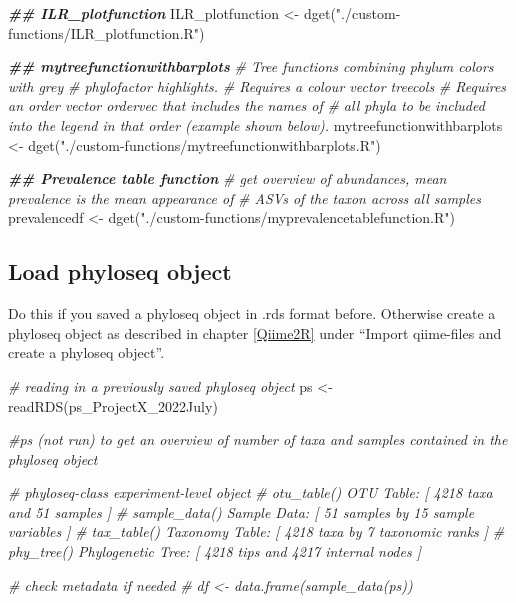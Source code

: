 \documentclass[
]{book}
\newenvironment{Shaded}{\begin{snugshade}}{\end{snugshade}}
\newcommand{\CommentTok}[1]{\textcolor[rgb]{0.56,0.35,0.01}{\textit{#1}}}
\newcommand{\DocumentationTok}[1]{\textcolor[rgb]{0.56,0.35,0.01}{\textbf{\textit{#1}}}}
\newcommand{\FunctionTok}[1]{\textcolor[rgb]{0.00,0.00,0.00}{#1}}
\newcommand{\NormalTok}[1]{#1}
\newcommand{\OtherTok}[1]{\textcolor[rgb]{0.56,0.35,0.01}{#1}}
\newcommand{\StringTok}[1]{\textcolor[rgb]{0.31,0.60,0.02}{#1}}
\begin{document}
\begin{Shaded}
\begin{Highlighting}[]
\DocumentationTok{\#\# ILR\_plotfunction}
\NormalTok{ILR\_plotfunction }\OtherTok{\textless{}{-}} \FunctionTok{dget}\NormalTok{(}\StringTok{"./custom{-}functions/ILR\_plotfunction.R"}\NormalTok{)}

\DocumentationTok{\#\# mytreefunctionwithbarplots}
\CommentTok{\# Tree functions combining phylum colors with grey }
\CommentTok{\# phylofactor highlights. }
\CommentTok{\# Requires a colour vector \textquotesingle{}treecols\textquotesingle{}}
\CommentTok{\# Requires an order vector \textquotesingle{}ordervec\textquotesingle{} that includes the names of }
\CommentTok{\# all phyla to be included into the legend in that order (example shown below). }
\NormalTok{mytreefunctionwithbarplots }\OtherTok{\textless{}{-}} \FunctionTok{dget}\NormalTok{(}\StringTok{"./custom{-}functions/mytreefunctionwithbarplots.R"}\NormalTok{)}

\DocumentationTok{\#\# Prevalence table function}
\CommentTok{\# get overview of abundances, mean prevalence is the mean \textquotesingle{}appearance\textquotesingle{} of }
\CommentTok{\# ASVs of the taxon across all samples}
\NormalTok{prevalencedf }\OtherTok{\textless{}{-}} \FunctionTok{dget}\NormalTok{(}\StringTok{"./custom{-}functions/myprevalencetablefunction.R"}\NormalTok{)}
\end{Highlighting}
\end{Shaded}

\hypertarget{load-phyloseq-object-2}{%
\subsection{Load phyloseq object}\label{load-phyloseq-object-2}}

Do this if you saved a phyloseq object in .rds format before. Otherwise create a phyloseq object as described in chapter \ref{Qiime2R} under ``Import qiime-files and create a phyloseq object''.

\begin{Shaded}
\begin{Highlighting}[]
\CommentTok{\# reading in a previously saved phyloseq object}
\NormalTok{ps }\OtherTok{\textless{}{-}} \FunctionTok{readRDS}\NormalTok{(}\StringTok{\textquotesingle{}ps\_ProjectX\_2022July\textquotesingle{}}\NormalTok{)}

\CommentTok{\#ps (not run) to get an overview of number of taxa and samples contained in the phyloseq object}

\CommentTok{\# phyloseq{-}class experiment{-}level object}
\CommentTok{\# otu\_table()   OTU Table:         [ 4218 taxa and 51 samples ]}
\CommentTok{\# sample\_data() Sample Data:       [ 51 samples by 15 sample variables ]}
\CommentTok{\# tax\_table()   Taxonomy Table:    [ 4218 taxa by 7 taxonomic ranks ]}
\CommentTok{\# phy\_tree()    Phylogenetic Tree: [ 4218 tips and 4217 internal nodes ]}

\CommentTok{\# check metadata if needed}
\CommentTok{\# df \textless{}{-} data.frame(sample\_data(ps))}
\end{Highlighting}
\end{Shaded}
\end{document}

